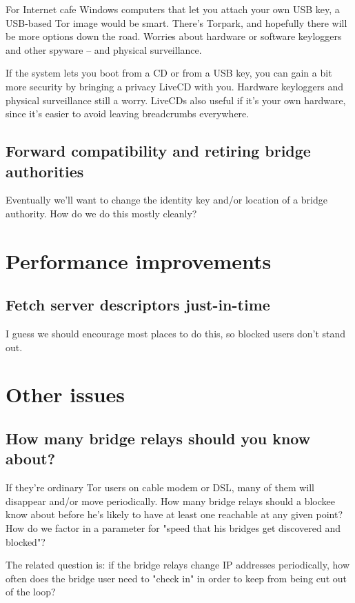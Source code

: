 \documentclass{llncs}
\begin{document}
For Internet cafe Windows computers that let you attach your own USB key,
a USB-based Tor image would be smart. There's Torpark, and hopefully
there will be more options down the road. Worries about hardware or
software keyloggers and other spyware -- and physical surveillance.

If the system lets you boot from a CD or from a USB key, you can gain
a bit more security by bringing a privacy LiveCD with you. Hardware
keyloggers and physical surveillance still a worry. LiveCDs also useful
if it's your own hardware, since it's easier to avoid leaving breadcrumbs
everywhere.

\subsection{Forward compatibility and retiring bridge authorities}

Eventually we'll want to change the identity key and/or location
of a bridge authority. How do we do this mostly cleanly?


\section{Performance improvements}

\subsection{Fetch server descriptors just-in-time}

I guess we should encourage most places to do this, so blocked
users don't stand out.

\section{Other issues}

\subsection{How many bridge relays should you know about?}

If they're ordinary Tor users on cable modem or DSL, many of them will
disappear and/or move periodically. How many bridge relays should a
blockee know
about before he's likely to have at least one reachable at any given point?
How do we factor in a parameter for "speed that his bridges get discovered
and blocked"?

The related question is: if the bridge relays change IP addresses
periodically, how often does the bridge user need to "check in" in order
to keep from being cut out of the loop?
\end{document}

